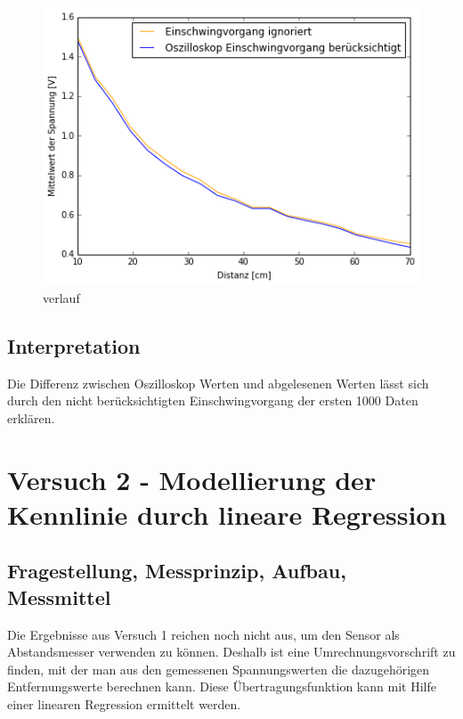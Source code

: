 \documentclass[12pt,oneside,a4paper]{report}
\begin{document}
\begin{figure}[H]
	\centering\small
	\includegraphics[width=\textwidth]{src/Diagramm1.png}
	\caption{verlauf}
	\label{fig:Diagramm1}
\end{figure}	

\section{Interpretation}
\label{chap:VERSUCH_1_INTERPRETATION}
Die Differenz zwischen Oszilloskop Werten und abgelesenen Werten lässt sich durch den nicht berücksichtigten Einschwingvorgang der ersten 1000 Daten erklären.


%
%
\chapter{Versuch 2 - Modellierung der Kennlinie durch lineare Regression}
\label{chap:VERSUCH_2}


\section{Fragestellung, Messprinzip, Aufbau, Messmittel}
\label{chap:VERSUCH_2_FRAGESTELLUNG}

Die Ergebnisse aus Versuch 1 reichen noch nicht aus, um den Sensor als Abstandsmesser verwenden zu können. Deshalb ist eine Umrechnungsvorschrift zu finden, mit der man aus den gemessenen Spannungswerten die dazugehörigen Entfernungswerte berechnen kann.
Diese Übertragungsfunktion kann mit Hilfe einer linearen Regression ermittelt werden.
\end{document}
